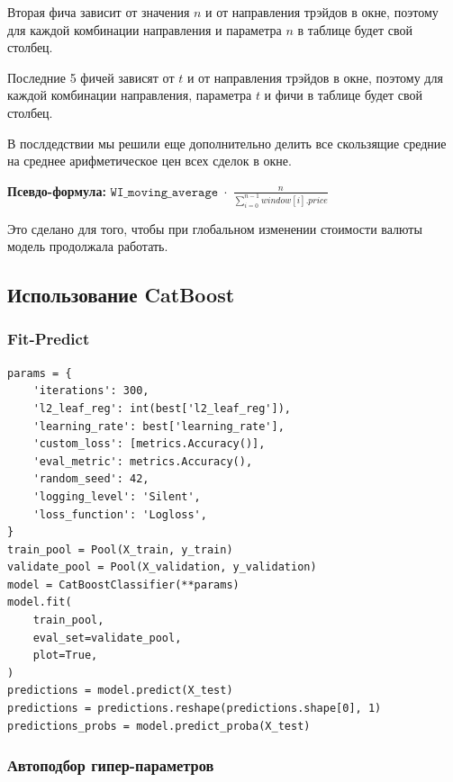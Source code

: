 Вторая фича зависит от значения $n$ и от направления трэйдов в окне, поэтому для каждой комбинации направления и параметра $n$ в таблице будет свой столбец.

Последние 5 фичей зависят от $t$ и от направления трэйдов в окне, поэтому для каждой комбинации направления, параметра $t$ и фичи в таблице будет свой столбец.

В послдедствии мы решили еще дополнительно делить все скользящие средние на среднее арифметическое цен всех сделок в окне. 

\textbf{Псевдо-формула:} $\texttt{WI\_moving\_average} \; \cdot \; \frac{n}{\sum\limits_{i=0}^{n - 1} window[i].price}$ 

Это сделано для того, чтобы при глобальном изменении стоимости валюты модель продолжала работать.

\subsection{Использование CatBoost}

\subsubsection{Fit-Predict}

\begin{verbatim}
params = {
    'iterations': 300,
    'l2_leaf_reg': int(best['l2_leaf_reg']),
    'learning_rate': best['learning_rate'],
    'custom_loss': [metrics.Accuracy()],
    'eval_metric': metrics.Accuracy(),
    'random_seed': 42,
    'logging_level': 'Silent',
    'loss_function': 'Logloss',
}
train_pool = Pool(X_train, y_train)
validate_pool = Pool(X_validation, y_validation)
model = CatBoostClassifier(**params)
model.fit(
    train_pool,
    eval_set=validate_pool,
    plot=True,
)
predictions = model.predict(X_test)
predictions = predictions.reshape(predictions.shape[0], 1)
predictions_probs = model.predict_proba(X_test)
\end{verbatim}

\subsubsection{Автоподбор гипер-параметров}

